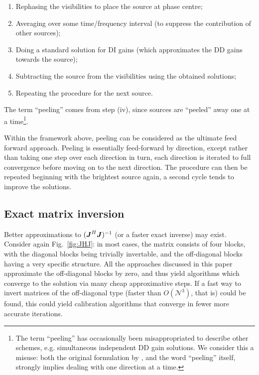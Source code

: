 \documentclass[useAMS,usenatbib]{mn2e}
\newcommand{\mat}[1]{{\bmath{#1}}}
\newcommand{\JJ}{\mat{J}} %
\newcommand{\JHJ}{\JJ^H\JJ} %
\begin{document}
\begin{enumerate}
\item Rephasing the visibilities to place the source at phase centre;
\item Averaging over some time/frequency interval (to suppress the contribution of other sources);
\item Doing a standard solution for DI gains (which approximates the DD gains towards the source);
\item Subtracting the source from the visibilities using the obtained solutions;
\item Repeating the procedure for the next source.
\end{enumerate}

The term ``peeling'' comes from step (iv), since sources are ``peeled'' away one at a time\footnote{The term ``peeling'' has 
occasionally been misappropriated to describe other schemes, e.g. simultaneous independent DD gain solutions. We consider this a 
misuse: both the original formulation by \citet{JEN:peeling}, and the word ``peeling'' itself, strongly implies dealing with 
one direction at a time.}.

Within the framework above, peeling can be considered as the ultimate feed forward approach. Peeling is essentially feed-forward by direction, except rather than taking one step over each direction in turn, each direction is iterated to full convergence before moving on to the next direction. The procedure can then be repeated beginning with the brightest source again, a second cycle tends to improve the solutions. 

\subsection{Exact matrix inversion}

\newcommand{\N}{\mathcal{N}}


Better approximations to $(\JHJ)^{-1}$ (or a faster exact inverse) may exist. Consider again Fig.~\ref{fig:JHJ}: in most cases, 
the matrix consists of four blocks, with the diagonal blocks being trivially invertable, and the off-diagonal blocks having a 
very specific structure. All the approaches discussed in this paper approximate the off-diagonal blocks by zero, and thus 
yield algorithms which converge to the solution via many cheap approximative steps. If a fast way to invert matrices of the 
off-diagonal type (faster than $O(\N^3)$, that is) could be found, this could yield calibration algorithms that converge in fewer more accurate iterations.
\end{document}

